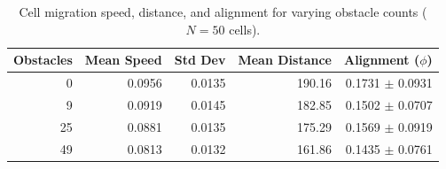 \begin{table}[h]
\centering
\caption{Cell migration speed, distance, and alignment for varying obstacle counts ($N=50$ cells).}
\label{tab:speedcheck}
\begin{tabular}{r r r r r}
\toprule
Obstacles & Mean Speed & Std Dev & Mean Distance & Alignment ($\phi$) \\
\midrule
0 & 0.0956 & 0.0135 & 190.16 & 0.1731 $\pm$ 0.0931 \\
9 & 0.0919 & 0.0145 & 182.85 & 0.1502 $\pm$ 0.0707 \\
25 & 0.0881 & 0.0135 & 175.29 & 0.1569 $\pm$ 0.0919 \\
49 & 0.0813 & 0.0132 & 161.86 & 0.1435 $\pm$ 0.0761 \\
\bottomrule
\end{tabular}
\end{table}
